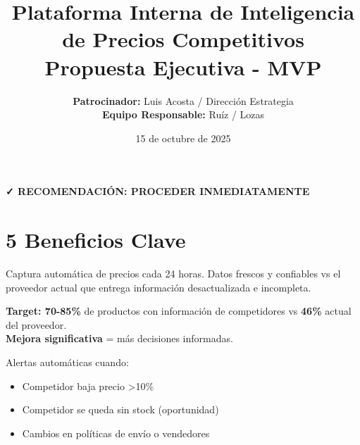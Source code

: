 \documentclass[12pt,a4paper]{article}
\title{
    \LARGE\textbf{Plataforma Interna de Inteligencia\\de Precios Competitivos}\\
    \vspace{0.5cm}
    \large Propuesta Ejecutiva - MVP
}
\author{
    \textbf{Patrocinador:} Luis Acosta / Dirección Estrategia\\
    \textbf{Equipo Responsable:} Ruíz / Lozas
}
\date{15 de octubre de 2025}
\begin{document}
\maketitle
\thispagestyle{empty}

\vspace{1cm}
\begin{center}
    \Large
    \textcolor{successgreen}{\textbf{✓ RECOMENDACIÓN: PROCEDER INMEDIATAMENTE}}
\end{center}

\vspace{0.5cm}
\begin{center}
\end{center}

\newpage
\tableofcontents
\newpage

\section*{5 Beneficios Clave}

\begin{tcolorbox}[colback=successgreen!10, colframe=successgreen, title=\textbf{1. Control Total de Información Competitiva}]
Captura automática de precios cada 24 horas. Datos frescos y confiables vs el proveedor actual que entrega información desactualizada e incompleta.
\end{tcolorbox}

\begin{tcolorbox}[colback=primaryblue!10, colframe=primaryblue, title=\textbf{2. Mejora Dramática en Cobertura}]
\textbf{Target: 70-85\%} de productos con información de competidores vs \textbf{46\%} actual del proveedor.\\
\textcolor{successgreen}{\textbf{Mejora significativa}} = más decisiones informadas.
\end{tcolorbox}

\begin{tcolorbox}[colback=successgreen!10, colframe=successgreen, title=\textbf{3. Reacción en Tiempo Real}]
Alertas automáticas cuando:
\begin{itemize}[leftmargin=*]
    \item Competidor baja precio >10\%
    \item Competidor se queda sin stock (oportunidad)
    \item Cambios en políticas de envío o vendedores
\end{itemize}
\end{tcolorbox}
\end{document}
